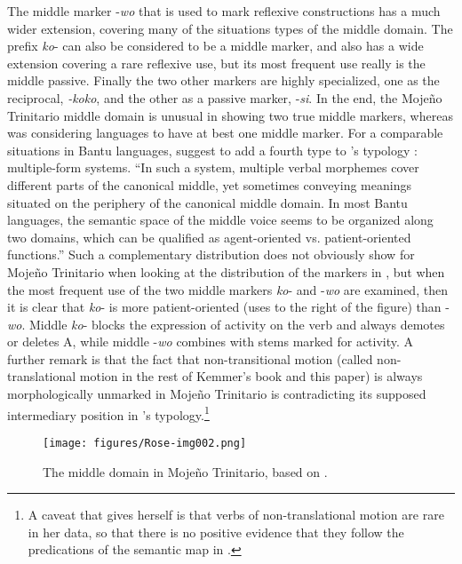 \documentclass[output=paper]{langscibook}
\begin{document}
The middle marker -\textit{wo} that is used to mark reflexive constructions has a much wider extension, covering many of the situations types of the middle domain. The prefix \textit{ko}- can also be considered to be a middle marker, and also has a wide extension covering a rare reflexive use, but its most frequent use really is the middle passive. Finally the two other markers are highly specialized, one as the reciprocal, \textit{-koko}, and the other as a passive marker, -\textit{si}. In the end, the Mojeño Trinitario middle domain is unusual in showing two true middle markers, whereas \citet{Kemmer1993} was considering languages to have at best one middle marker. For a comparable situations in Bantu languages, \citet[146]{DomEtAl2016} suggest to add a fourth type to \citet{Kemmer1993}’s typology : multiple-form systems. “In such a system, multiple verbal morphemes cover different parts of the canonical middle, yet sometimes conveying meanings situated on the periphery of the canonical middle domain. In most Bantu languages, the semantic space of the middle voice seems to be organized along two domains, which can be qualified as agent-oriented vs. patient-oriented functions.” Such a complementary distribution does not obviously show for Mojeño Trinitario when looking at the distribution of the markers in , but when the most frequent use of the two middle markers \textit{ko}- and -\textit{wo} are examined, then it is clear that \textit{ko}- is more patient-oriented (uses to the right of the figure) than -\textit{wo}. Middle \textit{ko}- blocks the expression of activity on the verb and always demotes or deletes A, while middle -\textit{wo} combines with stems marked for activity. A further remark is that the fact that non-transitional motion (called non-translational motion in the rest of Kemmer’s book and this paper) is always morphologically unmarked in Mojeño Trinitario is contradicting its supposed intermediary position in \citet[222]{Kemmer1993}’s typology.\footnote{A caveat that \citet[225]{Kemmer1993} gives herself is that verbs of non-translational motion are rare in her data, so that there is no positive evidence that they follow the predications of the semantic map in .}

\begin{figure}
\caption{\label{bkm:Ref39672373}The middle domain in Mojeño Trinitario, based on \citet[202]{Kemmer1993}.}

\texttt{[image: figures/Rose-img002.png]}
 \end{figure}
\end{document}
